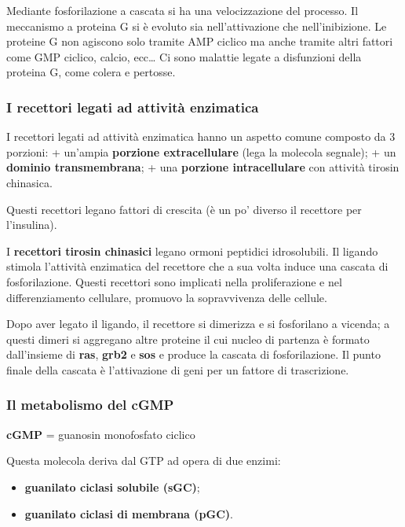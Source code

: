 \documentclass[]{article}
\begin{document}
Mediante fosforilazione a cascata si ha una velocizzazione del processo.
Il meccanismo a proteina G si è evoluto sia nell'attivazione che
nell'inibizione. Le proteine G non agiscono solo tramite AMP ciclico ma
anche tramite altri fattori come GMP ciclico, calcio, ecc\ldots{} Ci
sono malattie legate a disfunzioni della proteina G, come colera e
pertosse.

\subsubsection{I recettori legati ad attività
enzimatica}\label{i-recettori-legati-ad-attivituxe0-enzimatica}

I recettori legati ad attività enzimatica hanno un aspetto comune
composto da 3 porzioni: + un'ampia \textbf{porzione extracellulare}
(lega la molecola segnale); + un \textbf{dominio transmembrana}; + una
\textbf{porzione intracellulare} con attività tirosin chinasica.

Questi recettori legano fattori di crescita (è un po' diverso il
recettore per l'insulina).

I \textbf{recettori tirosin chinasici} legano ormoni peptidici
idrosolubili. Il ligando stimola l'attività enzimatica del recettore che
a sua volta induce una cascata di fosforilazione. Questi recettori sono
implicati nella proliferazione e nel differenziamento cellulare,
promuovo la sopravvivenza delle cellule.

Dopo aver legato il ligando, il recettore si dimerizza e si fosforilano
a vicenda; a questi dimeri si aggregano altre proteine il cui nucleo di
partenza è formato dall'insieme di \textbf{ras}, \textbf{grb2} e
\textbf{sos} e produce la cascata di fosforilazione. Il punto finale
della cascata è l'attivazione di geni per un fattore di trascrizione.

\subsubsection{Il metabolismo del cGMP}\label{il-metabolismo-del-cgmp}

\textbf{cGMP} = guanosin monofosfato ciclico

Questa molecola deriva dal GTP ad opera di due enzimi:

\begin{itemize}
\itemsep1pt\parskip0pt
\item
  \textbf{guanilato ciclasi solubile (sGC)};
\item
  \textbf{guanilato ciclasi di membrana (pGC)}.
\end{itemize}
\end{document}

